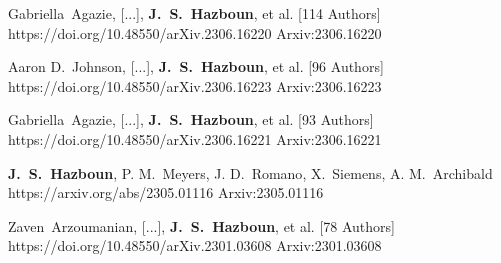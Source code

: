          {Gabriella~{Agazie}, [...], \textbf{J.~S.~{Hazboun}}, et al. [114 Authors]}
         {https://doi.org/10.48550/arXiv.2306.16220}
         {{Arxiv:}2306.16220}

         {Aaron D.~{Johnson}, [...], \textbf{J.~S.~{Hazboun}}, et al. [96 Authors]}
         {https://doi.org/10.48550/arXiv.2306.16223}
         {{Arxiv:}2306.16223}

         {Gabriella~{Agazie}, [...], \textbf{J.~S.~{Hazboun}}, et al. [93 Authors]}
         {https://doi.org/10.48550/arXiv.2306.16221}
         {{Arxiv:}2306.16221}

         {\textbf{J.~S.~Hazboun}, P. M.~{Meyers}, J. D.~{Romano}, X.~{Siemens}, A. M.~{Archibald}}
         {https://arxiv.org/abs/2305.01116}
         {{Arxiv:}2305.01116}

         {Zaven~{Arzoumanian}, [...], \textbf{J.~S.~{Hazboun}}, et al. [78 Authors]}
         {https://doi.org/10.48550/arXiv.2301.03608}
         {{Arxiv:}2301.03608}

